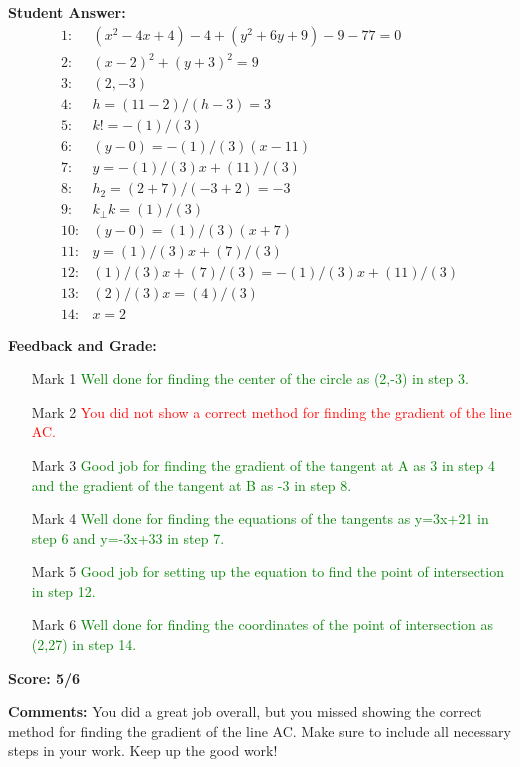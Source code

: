 \documentclass{article}
\begin{document}
\textbf{Student Answer:}
\begin{align*}
1: & (x^{2}-4x+4)-4+(y^{2}+6y+9)-9-77=0 \\
2: & (x-2)^{2}+(y+3)^{2}=9 \\
3: & (2,-3) \\
4: & h=(11-2)/(h-3)=3 \\
5: & k!=-(1)/(3) \\
6: & (y-0)=-(1)/(3)(x-11) \\
7: & y=-(1)/(3)x+(11)/(3) \\
8: & h_2=(2+7)/(-3+2)=-3 \\
9: & k_\perp k=(1)/(3) \\
10: & (y-0)=(1)/(3)(x+7) \\
11: & y=(1)/(3)x+(7)/(3) \\
12: & (1)/(3)x+(7)/(3)=-(1)/(3)x+(11)/(3) \\
13: & (2)/(3)x=(4)/(3) \\
14: & x=2
\end{align*}

\textbf{Feedback and Grade:}
\begin{itemize}
\item[Mark 1] \textcolor{green}{Well done for finding the center of the circle as (2,-3) in step 3.}
\item[Mark 2] \textcolor{red}{You did not show a correct method for finding the gradient of the line AC.}
\item[Mark 3] \textcolor{green}{Good job for finding the gradient of the tangent at A as 3 in step 4 and the gradient of the tangent at B as -3 in step 8.}
\item[Mark 4] \textcolor{green}{Well done for finding the equations of the tangents as y=3x+21 in step 6 and y=-3x+33 in step 7.}
\item[Mark 5] \textcolor{green}{Good job for setting up the equation to find the point of intersection in step 12.}
\item[Mark 6] \textcolor{green}{Well done for finding the coordinates of the point of intersection as (2,27) in step 14.}
\end{itemize}

\textbf{Score: 5/6}

\textbf{Comments:} You did a great job overall, but you missed showing the correct method for finding the gradient of the line AC. Make sure to include all necessary steps in your work. Keep up the good work!
\end{document}
